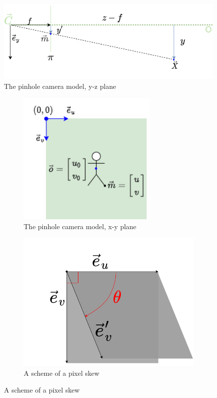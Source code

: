 \begin{figure}[h]
    \centering
    \includegraphics[width=\textwidth]{graphics/td_scene_yz.png}
    \caption{The pinhole camera model, y-z plane}
    \label{fig:td_scene_yz}
\end{figure}

\begin{figure}[h]
  \begin{subfigure}[b]{0.49\textwidth}
    \centering
    \includegraphics[width=0.74\textwidth]{graphics/td_scene_xy.png}
    \caption{The pinhole camera model, x-y plane}
    \label{fig:td_scene_xy}
  \end{subfigure}
  \hfill
  \begin{subfigure}[b]{0.49\textwidth}
    \centering
    \includegraphics[width=1\textwidth]{graphics/pixel.png}
    \caption{A scheme of a pixel skew}
    \label{fig:Kframes}
  \end{subfigure}
\end{figure}

